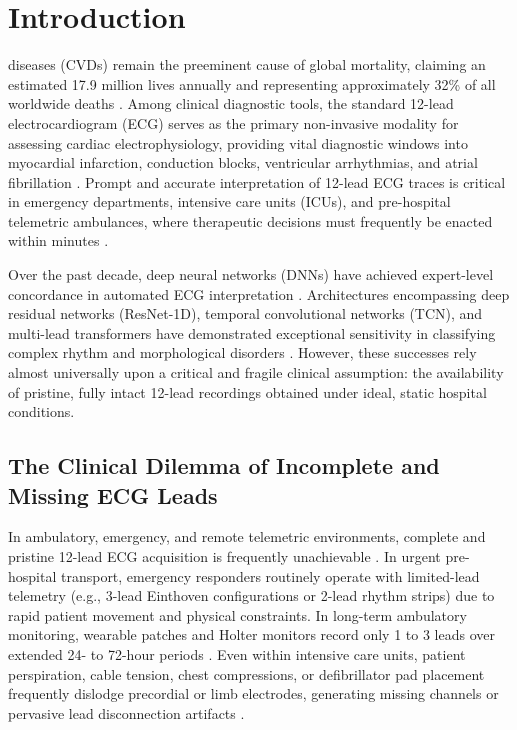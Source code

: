 \documentclass[journal]{IEEEtran}
\begin{document}
\section{Introduction}
 diseases (CVDs) remain the preeminent cause of global mortality, claiming an estimated 17.9 million lives annually and representing approximately 32\% of all worldwide deaths \cite{ref_1}. Among clinical diagnostic tools, the standard 12-lead electrocardiogram (ECG) serves as the primary non-invasive modality for assessing cardiac electrophysiology, providing vital diagnostic windows into myocardial infarction, conduction blocks, ventricular arrhythmias, and atrial fibrillation \cite{ref_2,ref_3}. Prompt and accurate interpretation of 12-lead ECG traces is critical in emergency departments, intensive care units (ICUs), and pre-hospital telemetric ambulances, where therapeutic decisions must frequently be enacted within minutes \cite{ref_4}.

Over the past decade, deep neural networks (DNNs) have achieved expert-level concordance in automated ECG interpretation \cite{ref_5,ref_6,ref_7}. Architectures encompassing deep residual networks (ResNet-1D), temporal convolutional networks (TCN), and multi-lead transformers have demonstrated exceptional sensitivity in classifying complex rhythm and morphological disorders \cite{ref_8,ref_9,ref_10}. However, these successes rely almost universally upon a critical and fragile clinical assumption: the availability of pristine, fully intact 12-lead recordings obtained under ideal, static hospital conditions.

\subsection{The Clinical Dilemma of Incomplete and Missing ECG Leads}
In ambulatory, emergency, and remote telemetric environments, complete and pristine 12-lead ECG acquisition is frequently unachievable \cite{ref_11}. In urgent pre-hospital transport, emergency responders routinely operate with limited-lead telemetry (e.g., 3-lead Einthoven configurations or 2-lead rhythm strips) due to rapid patient movement and physical constraints. In long-term ambulatory monitoring, wearable patches and Holter monitors record only 1 to 3 leads over extended 24- to 72-hour periods \cite{ref_12}. Even within intensive care units, patient perspiration, cable tension, chest compressions, or defibrillator pad placement frequently dislodge precordial or limb electrodes, generating missing channels or pervasive lead disconnection artifacts \cite{ref_13,ref_14}.
\end{document}
